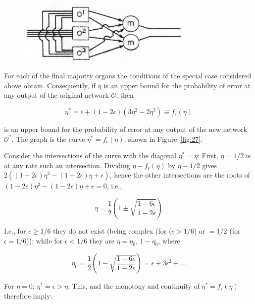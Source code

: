 \documentclass[twocolumn,preprintnumbers,amsmath,amssymb,floatfix]{revtex4}
\begin{document}
\begin{figure}
\includegraphics[width=3.4in]{fig_26}
\caption{\label{fig:26}}
\end{figure}

For each of the final majority organs the conditions of the
special case considered above obtain. Consequently, if $\eta$ is
an upper bound for the probability of error at any output of the
original network $\mathcal{O}$, then

\begin{equation}
\eta^*=\epsilon+(1-2\epsilon)(3\eta^2-2\eta^3)\equiv
f_\epsilon(\eta) \label{eq:9}
\end{equation}

\noindent is an upper bound for the probability of error at any
output of the new network $\mathcal{O}^*$. The graph is the curve
$\eta^*=f_\epsilon(\eta)$, shown in Figure~\ref{fig:27}.

Consider the intersections of the curve with the diagonal
$\eta^*=\eta$: First, $\eta=1/2$ is at any rate such an
intersection. Dividing $\eta-f_\epsilon(\eta)$ by $\eta-1/2$ gives
$2((1-2\epsilon)\eta^2-(1-2\epsilon)\eta+\epsilon)$, hence the
other intersections are the roots of
$(1-2\epsilon)\eta^2-(1-2\epsilon)\eta+\epsilon=0$, i.e.,

\begin{equation*}
\eta = \frac{1}{2}\left(1 \pm
\sqrt{\frac{1-6\epsilon}{1-2\epsilon}}\right)
\end{equation*}

\noindent I.e., for $\epsilon\geq1/6$ they do not exist (being
complex (for ($\epsilon>1/6$) or $=1/2$ (for $\epsilon=1/6$));
while for $\epsilon<1/6$ they are $\eta=\eta_0$, $1-\eta_0$, where

\begin{equation}
\eta_0=\frac{1}{2}\left(1-\sqrt{\frac{1-6\epsilon}{1-2\epsilon}}\right)=\epsilon+3\epsilon^2+\ldots
\label{eq:10}
\end{equation}

\noindent For $\eta=0$; $\eta^*=\epsilon>\eta$. This, and the
monotony and continuity of $\eta^*=f_\epsilon(\eta)$ therefore
imply:\\
\end{document}
